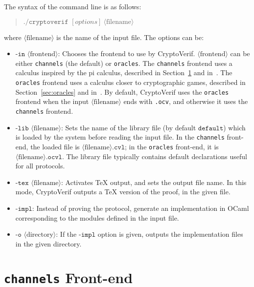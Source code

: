 \documentclass{article}
\newcommand{\nonterm}[1]{\langle\textrm{#1}\rangle}
\begin{document}
The syntax of the command line is as follows:
\begin{quote}
$\texttt{./cryptoverif }[options]\ \nonterm{filename}$
\end{quote}
where $\nonterm{filename}$ is the name of the input file.
The options can be:
\begin{itemize}

\item $\texttt{-in }\nonterm{frontend}$: Chooses the frontend to use
by CryptoVerif. $\nonterm{frontend}$ can be either \texttt{channels}
(the default) or \texttt{oracles}. The \texttt{channels} frontend
uses a calculus inspired by the pi calculus, described 
in Section~\ref{sec:channels} and in~\cite{Blanchet06,BlanchetEPrint05}.
The \texttt{oracles} frontend uses a calculus closer to cryptographic
games, described in Section~\ref{sec:oracles} and 
in~\cite{Blanchet06b,BlanchetPointchevalEPrint06}.
By default, CryptoVerif uses the \texttt{oracles} frontend when the input
$\nonterm{filename}$ ends with \texttt{.ocv}, and otherwise it uses the
\texttt{channels} frontend.

\item $\texttt{-lib }\nonterm{filename}$: Sets the name of the library
  file (by default $\texttt{default}$) which is loaded by the system
  before reading the input file. In the \texttt{channels} front-end,
  the loaded file is $\nonterm{filename}\texttt{.cvl}$; in the
  \texttt{oracles} front-end, it is
  $\nonterm{filename}\texttt{.ocvl}$. The library file typically
  contains default declarations useful for all protocols.

\item $\texttt{-tex }\nonterm{filename}$: Activates TeX output, and sets
the output file name. In this mode, CryptoVerif outputs a TeX version
of the proof, in the given file.

\item $\texttt{-impl}$: Instead of proving the protocol, generate an
  implementation in OCaml corresponding to the modules defined in the input
  file.

\item $\texttt{-o }\nonterm{directory}$: If the $\texttt{-impl}$ option
  is given, outputs the implementation files in the given directory.

\end{itemize}

\newif\ifchannels

\section{\texttt{channels} Front-end}\label{sec:channels}
\end{document}
